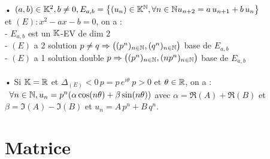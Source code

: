 \documentclass[12 pt]{book}
\begin{document}
\begin{flushleft}
\begin{doublespace}
	\text{ }\\
	• $(a,b)\in\mathbb{K}^2 , b\ne 0 , E_{a,b} = \big\{ (u_n)\in\mathbb{K}^{\mathbb{N}} , \forall n\in\mathbb{N} u_{n+2} = a\, u_{n+1} + b\, u_n\big\}$\\
	et $(E) : x^2 - ax - b =0$, on a :\\
	 - $E_{a,b}$ est un $\mathbb{K}$-EV de dim 2\\
     - $(E)$ a 2 solution $p\ne q \Rightarrow \big( (p^n)_{n\in\mathbb{N}} , (q^n)_{n\in\mathbb{N}} \big)$ base de $E_{a,b}$\\
     - $(E)$ a 1 solution double $p \Rightarrow \big( (p^n)_{n\in\mathbb{N}} , (n p^n)_{n\in\mathbb{N}} \big)$ base de $E_{a,b}$\\
    \text{}\\
	• Si $\mathbb{K} = \mathbb{R}$ et $\Delta_{(E)} < 0 \, p=p \, e^{i\theta} \ p>0$ et $\theta\in\mathbb{R}$, on a :\\
	\qquad \ $\forall n\in\mathbb{N} , u_n = p^n (\alpha \cos(n \theta) + \beta \sin(n \theta) )$ avec $\alpha = \Re(A) + \Re(B)$ et $\beta = \Im(A) - \Im(B)$ et $u_n = A \, p^n + B \, q^n$.\\
	

\end{doublespace}
\end{flushleft}

\section*{Matrice}
\end{document}
